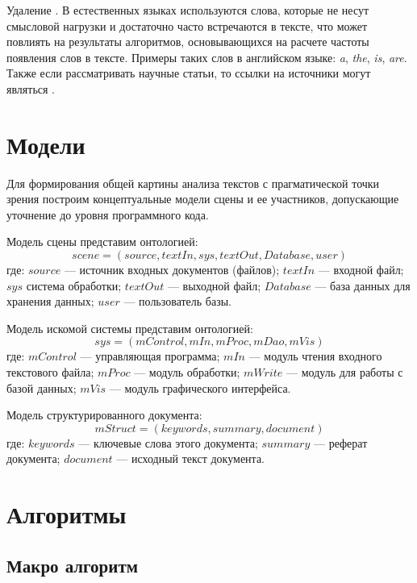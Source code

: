 Удаление . В естественных языках используются слова, которые не несут смысловой нагрузки и достаточно часто встречаются в тексте, что может повлиять на результаты алгоритмов, основывающихся на расчете частоты появления слов в тексте. Примеры таких слов в английском языке: \textit{a}, \textit{the}, \textit{is}, \textit{are}. Также если рассматривать научные статьи, то ссылки на источники могут являться .

\section{Модели}

Для формирования общей картины анализа текстов с прагматической точки зрения построим концептуальные модели сцены и ее участников, допускающие уточнение до уровня программного кода.

Модель сцены представим онтологией:
\begin{equation}
\label{eq:scene}
scene = (source, textIn, sys, textOut, Database, user)
\end{equation}
где: $source$ --- источник входных документов (файлов); $textIn$ --- входной файл; $sys$ система обработки; $textOut$ --- выходной файл; $Database$ --- база данных для хранения данных; $user$ --- пользователь базы.

Модель искомой системы представим онтологией:
\begin{equation}
\label{eq:system}
sys = (mControl, mIn, mProc, mDao, mVis)
\end{equation}
где: $mControl$ --- управляющая программа; $mIn$ --- модуль чтения входного текстового файла; $mProc$ --- модуль обработки; $mWrite$ --- модуль для работы с базой данных; $mVis$ --- модуль графического интерфейса.


Модель структурированного документа:
\begin{equation}
mStruct = (keywords, summary, document)
\end{equation}
где: $keywords$ --- ключевые слова этого документа; $summary$ --- реферат документа; $document$ --- исходный текст документа.

\section{Алгоритмы}

\subsection{Макро алгоритм}

